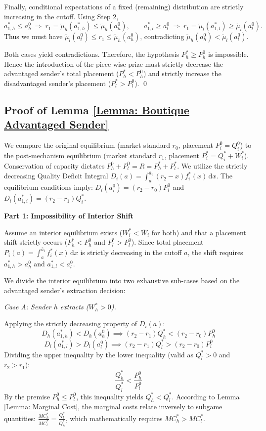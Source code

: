 \documentclass[12pt, a4paper]{article}
\begin{document}
Finally, conditional expectations of a fixed (remaining) distribution are strictly increasing in the cutoff. Using Step 2,
\[
a_{1,h}^*\le a_h^0 \ \Rightarrow\ r_1=\tilde{\mu}_h(a_{1,h}^*)\le \tilde{\mu}_h(a_h^0),
\qquad
a_{1,l}^*\ge a_l^0 \ \Rightarrow\ r_1=\tilde{\mu}_l(a_{1,l}^*)\ge \tilde{\mu}_l(a_l^0).
\]
Thus we must have $\tilde{\mu}_l(a_l^0)\le r_1\le \tilde{\mu}_h(a_h^0)$, contradicting $\tilde{\mu}_h(a_h^0)<\tilde{\mu}_l(a_l^0)$.

\medskip
\noindent
Both cases yield contradictions. Therefore, the hypothesis $P_h^*\ge P_h^0$ is impossible. Hence the introduction of the piece-wise prize must strictly decrease the advantaged sender's total placement ($P_h^* < P_h^0$) and strictly increase the disadvantaged sender's placement ($P_l^* > P_l^0$). \qed

\subsection*{Proof of Lemma \ref{Lemma: Boutique Advantaged Sender}}

We compare the original equilibrium (market standard $r_0$, placement $P_i^0 = Q_i^0$) to the post-mechanism equilibrium (market standard $r_1$, placement $P_i^* = Q_i^* + W_i^*$). Conservation of capacity dictates $P_h^0 + P_l^0 = R = P_h^* + P_l^*$.
We utilize the strictly decreasing Quality Deficit Integral $D_i(a) = \int_a^{\bar{a}_i} (r_2 - x) f_i^*(x) \, \mathrm{d}x$. The equilibrium conditions imply: $D_i(a_i^0) = (r_2 - r_0)P_i^0$ and $D_i(a_{1,i}^*) = (r_2 - r_1)Q_i^*$.

\textbf{Part 1: Impossibility of Interior Shift}

Assume an interior equilibrium exists ($W_i^* < \bar{W}_i$ for both) and that a placement shift strictly occurs ($P_h^* < P_h^0$ and $P_l^* > P_l^0$). 
Since total placement $P_i(a) = \int_a^{\bar{a}_i} f_i^*(x) \, \mathrm{d}x$ is strictly decreasing in the cutoff $a$, the shift requires $a_{1,h}^* > a_h^0$ and $a_{1,l}^* < a_l^0$.

We divide the interior equilibrium into two exhaustive sub-cases based on the advantaged sender's extraction decision:

\textit{Case A: Sender $h$ extracts ($W_h^* > 0$).}

Applying the strictly decreasing property of $D_i(a)$:
$$D_h(a_{1,h}^*) < D_h(a_h^0) \implies (r_2 - r_1)Q_h^* < (r_2 - r_0)P_h^0$$
$$D_l(a_{1,l}^*) > D_l(a_l^0) \implies (r_2 - r_1)Q_l^* > (r_2 - r_0)P_l^0$$
Dividing the upper inequality by the lower inequality (valid as $Q_l^* > 0$ and $r_2 > r_1$):
$$\frac{Q_h^*}{Q_l^*} < \frac{P_h^0}{P_l^0}$$
By the premise $P_h^0 \le P_l^0$, this inequality yields $Q_h^* < Q_l^*$.
According to Lemma \ref{Lemma: Marginal Cost}, the marginal costs relate inversely to subgame quantities: $\frac{MC_h^*}{MC_l^*} = \frac{Q_l^*}{Q_h^*}$, which mathematically requires $MC_h^* > MC_l^*$.
\end{document}
